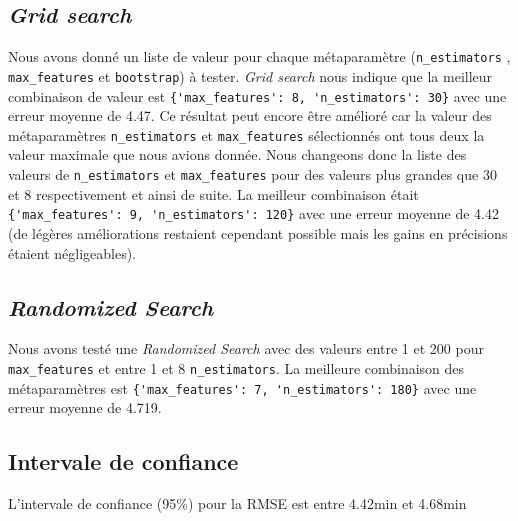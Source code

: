 \subsection{\textit{Grid search}}
Nous avons donné un liste de valeur pour chaque métaparamètre (\lstinline!n_estimators! , \lstinline!max_features! et \lstinline!bootstrap!) à tester. \textit{Grid search} nous indique que la meilleur combinaison de valeur est \lstinline!{'max_features': 8, 'n_estimators': 30}! avec une erreur moyenne de 4.47. Ce résultat peut encore être amélioré car la valeur des métaparamètres \lstinline!n_estimators! et \lstinline!max_features! sélectionnés ont tous deux la valeur maximale que nous avions donnée. Nous changeons donc la liste des valeurs de \lstinline!n_estimators! et \lstinline!max_features! pour des valeurs plus grandes que 30 et 8 respectivement et ainsi de suite. La meilleur combinaison était \lstinline!{'max_features': 9, 'n_estimators': 120}! avec une erreur moyenne de 4.42 (de légères améliorations restaient cependant possible mais les gains en précisions étaient négligeables).

\subsection{\textit{Randomized Search}}
Nous avons testé une \textit{Randomized Search} avec des valeurs entre 1 et 200 pour \lstinline!max_features! et entre 1 et 8 \lstinline!n_estimators!. La meilleure combinaison des métaparamètres est \lstinline!{'max_features': 7, 'n_estimators': 180}! avec une erreur moyenne de 4.719.

\subsection{Intervale de confiance}
L'intervale de confiance (95\%) pour la RMSE est entre 4.42min et 4.68min
